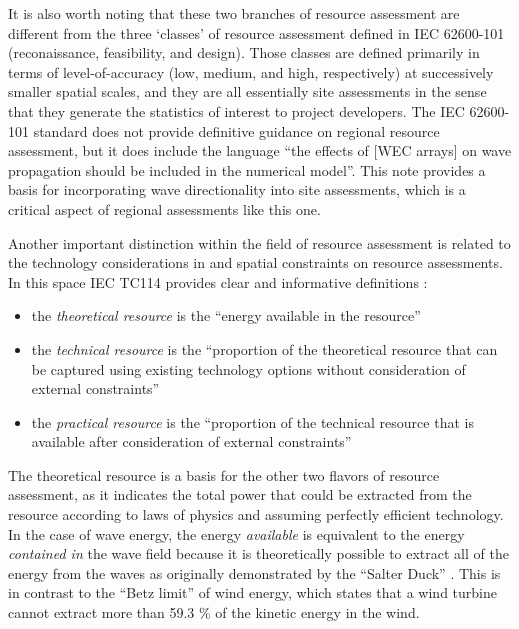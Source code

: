It is also worth noting that these two branches of resource assessment are different from the three `classes' of resource assessment defined in IEC 62600-101 (reconaissance, feasibility, and design). Those classes are defined primarily in terms of level-of-accuracy (low, medium, and high, respectively) at successively smaller spatial scales, and they are all essentially site assessments in the sense that they generate the statistics of interest to project developers.
The IEC 62600-101 standard does not provide definitive guidance on regional resource assessment, but it does include the language ``the effects of [WEC arrays] on wave propagation should be included in the numerical model''. This note provides a basis for incorporating wave directionality into site assessments, which is a critical aspect of regional assessments like this one.

Another important distinction within the field of resource assessment is related to the technology considerations in and spatial constraints on resource assessments. In this space IEC TC114 provides clear and informative definitions \citep{internationalelectrotechnicalcommissionPartTerminologyEdition2020}:
\begin{itemize}
  \item the {\it theoretical resource} is the ``energy available in the resource''
  \item the {\it technical resource} is the ``proportion of the theoretical resource that can be captured using existing technology options without consideration of external constraints''
  \item the {\it practical resource} is the ``proportion of the technical resource that is available after consideration of external constraints''
\end{itemize}

The theoretical resource is a basis for the other two flavors of resource assessment, as it indicates the total power that could be extracted from the resource according to laws of physics and assuming perfectly efficient technology. In the case of wave energy, the energy {\em available} is equivalent to the energy {\em contained in} the wave field because it is theoretically possible to extract all of the energy from the waves as originally demonstrated by the ``Salter Duck'' \citep{salterRecentProgressDucks1980}. This is in contrast to the ``Betz limit'' of wind energy, which states that a wind turbine cannot extract more than 59.3 \% of the kinetic energy in the wind.

